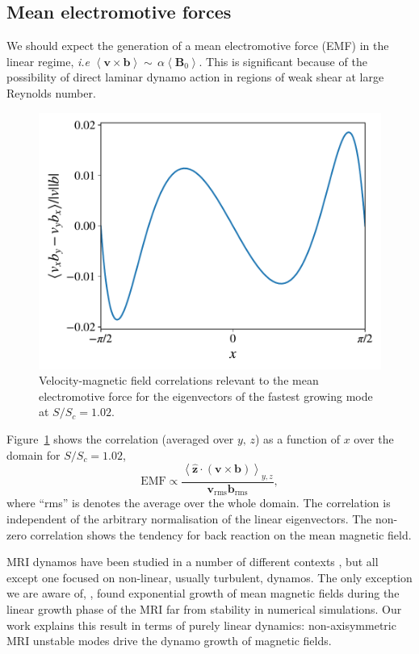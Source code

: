 \documentclass{rsproca_new}%
\newcommand{\SSC}{S/S_{c}}
\begin{document}
\subsection{Mean electromotive forces}
\label{sec:emf}
We should expect the generation of a mean electromotive force (EMF) in the linear regime, \textit{i.e}
$\left<\boldsymbol{v}\times\boldsymbol{b}\right>\sim\,\alpha\!\left<\boldsymbol{B}_{0}\right>$.
This is significant because of the possibility of direct laminar dynamo action in regions of weak shear at large Reynolds number.
\begin{figure}[h!]
  \includegraphics[width=\columnwidth]{mean_field_alpha_run_11_output.pdf}
  \caption{Velocity-magnetic field correlations relevant to the mean electromotive force for the eigenvectors of the fastest growing mode at $\SSC = 1.02$.}
  \label{fig:correlation}
\end{figure}
Figure~\ref{fig:correlation} shows the correlation (averaged over $y,\,z$) as a function of $x$ over the domain for $\SSC = 1.02$,
\begin{equation}
\text{EMF}\propto\frac{\left<\boldsymbol{\hat{z}}\cdot(\boldsymbol{v}\times\boldsymbol{b})\right>_{\!y,z}}{\boldsymbol{v}_{\text{rms}}\boldsymbol{b}_{\text{rms}}},
\end{equation}
where ``rms'' is denotes the average over the whole domain. 
The correlation is independent of the arbitrary normalisation of the linear eigenvectors.
The non-zero correlation shows the tendency for back reaction on the mean magnetic field.

MRI dynamos have been studied in a number of different contexts \cite{2007PhRvL..98y4502R,2011ApJ...740...18O,2015PhRvL.114h5002S}, but all except one focused on non-linear, usually turbulent, dynamos. 
The only exception we are aware of, \cite{2016MNRAS.462..818B}, found exponential growth of mean magnetic fields during the linear growth phase of the MRI far from stability in numerical simulations.
Our work explains this result in terms of purely linear dynamics:
non-axisymmetric MRI unstable modes drive the dynamo growth of magnetic fields.
\end{document}
